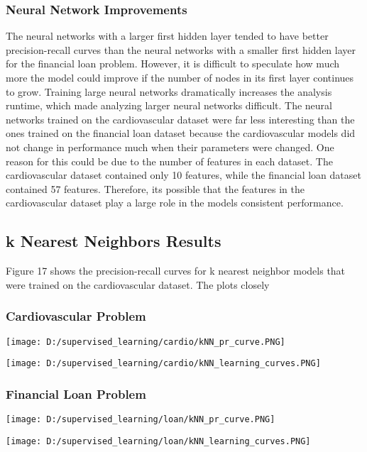 \documentclass[10pt,journal,compsoc]{IEEEtran}
\begin{document}
\subsubsection{Neural Network Improvements}
The neural networks with a larger first hidden layer tended to have better precision-recall curves than the neural networks with a smaller first hidden layer for the financial loan problem. However, it is difficult to speculate how much more the model could improve if the number of nodes in its first layer continues to grow. Training large neural networks dramatically increases the analysis runtime, which made analyzing larger neural networks difficult.
The neural networks trained on the cardiovascular dataset were far less interesting than the ones trained on the financial loan dataset because the cardiovascular models did not change in performance much when their parameters were changed. One reason for this could be due to the number of features in each dataset. The cardiovascular dataset contained only 10 features, while the financial loan dataset contained 57 features. Therefore, its possible that the features in the cardiovascular dataset play a large role in the models consistent performance.
\subsection{k Nearest Neighbors Results}
Figure 17 shows the precision-recall curves for k nearest neighbor models that were trained on the cardiovascular dataset. The plots closely
\subsubsection{Cardiovascular Problem}
\begin{center}
	\texttt{[image: D:/supervised\_learning/cardio/kNN\_pr\_curve.PNG]}
\end{center}
\begin{center}
	\texttt{[image: D:/supervised\_learning/cardio/kNN\_learning\_curves.PNG]}
\end{center}
\subsubsection{Financial Loan Problem}
\begin{center}
	\texttt{[image: D:/supervised\_learning/loan/kNN\_pr\_curve.PNG]}
\end{center}
\begin{center}
	\texttt{[image: D:/supervised\_learning/loan/kNN\_learning\_curves.PNG]}
\end{center}
\end{document}
